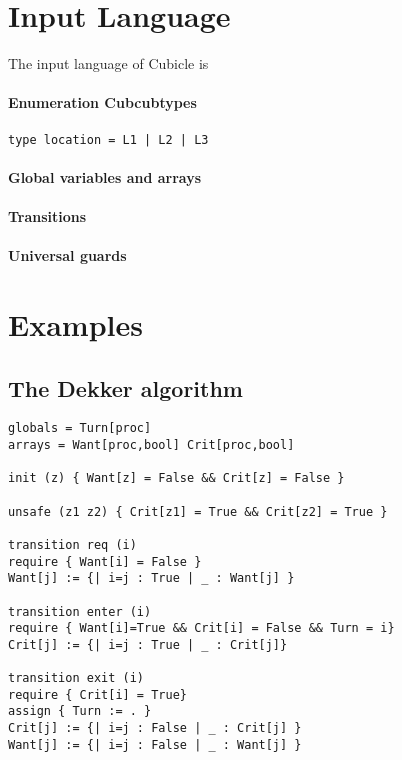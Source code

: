 \documentclass[a4paper,12pt]{article}
\begin{document}
\begin{verbatim}

\end{verbatim}

\section{Input Language}

The input language of Cubicle is 

\paragraph{Enumeration Cubcubtypes}

\begin{verbatim}
type location = L1 | L2 | L3
\end{verbatim}

\paragraph{Global variables and arrays}

\paragraph{Transitions}

\paragraph{Universal guards}

\section{Examples}

\subsection{The Dekker algorithm}

\begin{verbatim}
globals = Turn[proc]
arrays = Want[proc,bool] Crit[proc,bool]

init (z) { Want[z] = False && Crit[z] = False }

unsafe (z1 z2) { Crit[z1] = True && Crit[z2] = True }

transition req (i)
require { Want[i] = False }
Want[j] := {| i=j : True | _ : Want[j] }

transition enter (i)
require { Want[i]=True && Crit[i] = False && Turn = i}
Crit[j] := {| i=j : True | _ : Crit[j]}

transition exit (i)
require { Crit[i] = True}
assign { Turn := . }
Crit[j] := {| i=j : False | _ : Crit[j] }
Want[j] := {| i=j : False | _ : Want[j] }
\end{verbatim}
\end{document}
